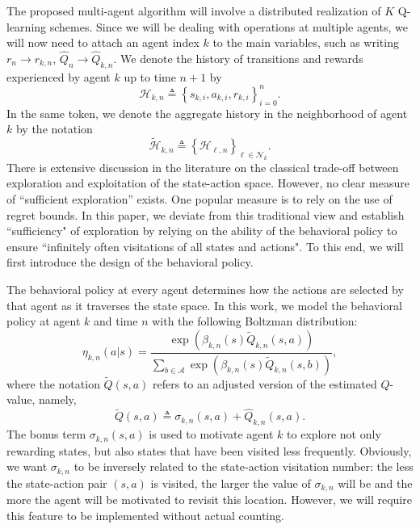 \documentclass[lettersize,journal]{IEEEtran}
\begin{document}
The proposed multi-agent algorithm will involve a distributed realization of $K$ Q-learning schemes. Since we will be dealing with operations at multiple agents, we will now need to attach an agent index $k$ to the main variables, such as writing $r_n \to r_{k,n}$, $\widehat{Q}_{n} \to \widehat{Q}_{k,n}$.
We denote the history of transitions and rewards   experienced by agent $k$ up to time $n+1$  by \begin{equation}
    \mathcal{H}_{k,n}\triangleq \left \{s_{k,i}, a_{k,i},r_{k,i}\right\}_{i=0}^{n}.
\end{equation}
In the same token, we denote the aggregate history in the neighborhood of agent $k$ by the notation  
\begin{equation}
    \widetilde{\mathcal{H}}_{k,n}\triangleq \left\{\mathcal{H}_{\ell,n}\right\}_{\ell\in\mathcal{N}_k}.
\end{equation}
There is extensive discussion in the literature on the classical trade-off between exploration and exploitation of the state-action space. However, no clear measure of ``sufficient exploration'' exists. One popular measure is to rely on the use of regret bounds. In this paper, 
we deviate from this traditional view and establish ``sufficiency" of exploration by relying on the ability of the behavioral policy to ensure ``infinitely often visitations of all states and actions". To this end,  we will first introduce the design of the behavioral policy.  \par
The behavioral policy at every agent determines how the actions are selected by that agent as it traverses the state space. In this work, we model the behavioral policy  at agent $k$ and time $n$ with the following Boltzman distribution:
\begin{equation}
\label{eq:policy}
\eta_{k,n} \left(a|s\right)=\frac{\exp \left(\beta_{k,n}(s)\widetilde{Q}_{k,n}(s,a)\right)}{\sum_{b \in \mathcal{A}} \exp \left(\beta_{k,n}(s) \widetilde{Q}_{k,n}(s,b)\right)},
\end{equation}
where the notation $\widetilde{Q}(s,a)$ refers to an adjusted version of the estimated $Q$-value, namely, 
 $$\widetilde{Q}(s,a)\triangleq\sigma_{k,n} (s,a)+\widehat{Q}_{k,n}(s,a).$$ The bonus term  $\sigma_{k,n} (s,a)$ is used to motivate agent $k$ to explore not only rewarding states, but also states that have been visited less frequently. Obviously, we want $\sigma_{k,n}$ to be inversely related to the state-action visitation number: the less the state-action pair $(s,a)$ is  visited, the larger the value of $\sigma_{k,n}$ will be and the more the agent will be motivated to revisit this location. However, we will require this feature to be implemented without actual counting.
 
\end{document}
